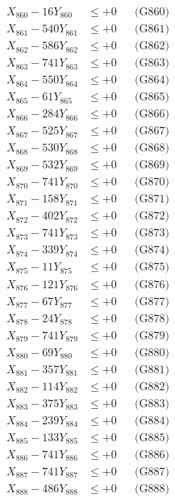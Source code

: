 \documentclass[a4paper,10pt]{article}
\begin{document}
{\begin{align}
X_{860} - 16Y_{860} &\leq +0 && \text{(G860)} \\
\allowbreak
X_{861} - 540Y_{861} &\leq +0 && \text{(G861)} \\
X_{862} - 586Y_{862} &\leq +0 && \text{(G862)} \\
X_{863} - 741Y_{863} &\leq +0 && \text{(G863)} \\
X_{864} - 550Y_{864} &\leq +0 && \text{(G864)} \\
X_{865} - 61Y_{865} &\leq +0 && \text{(G865)} \\
X_{866} - 284Y_{866} &\leq +0 && \text{(G866)} \\
X_{867} - 525Y_{867} &\leq +0 && \text{(G867)} \\
X_{868} - 530Y_{868} &\leq +0 && \text{(G868)} \\
X_{869} - 532Y_{869} &\leq +0 && \text{(G869)} \\
X_{870} - 741Y_{870} &\leq +0 && \text{(G870)} \\
\allowbreak
X_{871} - 158Y_{871} &\leq +0 && \text{(G871)} \\
X_{872} - 402Y_{872} &\leq +0 && \text{(G872)} \\
X_{873} - 741Y_{873} &\leq +0 && \text{(G873)} \\
X_{874} - 339Y_{874} &\leq +0 && \text{(G874)} \\
X_{875} - 11Y_{875} &\leq +0 && \text{(G875)} \\
X_{876} - 121Y_{876} &\leq +0 && \text{(G876)} \\
X_{877} - 67Y_{877} &\leq +0 && \text{(G877)} \\
X_{878} - 24Y_{878} &\leq +0 && \text{(G878)} \\
X_{879} - 741Y_{879} &\leq +0 && \text{(G879)} \\
X_{880} - 69Y_{880} &\leq +0 && \text{(G880)} \\
\allowbreak
X_{881} - 357Y_{881} &\leq +0 && \text{(G881)} \\
X_{882} - 114Y_{882} &\leq +0 && \text{(G882)} \\
X_{883} - 375Y_{883} &\leq +0 && \text{(G883)} \\
X_{884} - 239Y_{884} &\leq +0 && \text{(G884)} \\
X_{885} - 133Y_{885} &\leq +0 && \text{(G885)} \\
X_{886} - 741Y_{886} &\leq +0 && \text{(G886)} \\
X_{887} - 741Y_{887} &\leq +0 && \text{(G887)} \\
X_{888} - 486Y_{888} &\leq +0 && \text{(G888)} \\

\end{align}}
\end{document}
